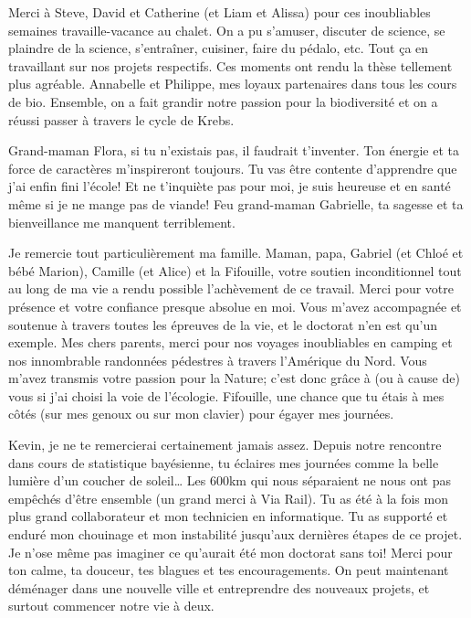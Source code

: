 Merci à Steve, David et Catherine (et Liam et Alissa) pour ces
inoubliables semaines travaille-vacance au chalet. On a pu s'amuser,
discuter de science, se plaindre de la science, s'entraîner, cuisiner,
faire du pédalo, etc. Tout ça en travaillant sur nos projets respectifs.
Ces moments ont rendu la thèse tellement plus agréable. Annabelle et
Philippe, mes loyaux partenaires dans tous les cours de bio. Ensemble,
on a fait grandir notre passion pour la biodiversité et on a réussi
passer à travers le cycle de Krebs.

Grand-maman Flora, si tu n'existais pas, il faudrait t'inventer. Ton
énergie et ta force de caractères m'inspireront toujours. Tu vas être
contente d'apprendre que j'ai enfin fini l'école! Et ne t'inquiète pas
pour moi, je suis heureuse et en santé même si je ne mange pas de
viande! Feu grand-maman Gabrielle, ta sagesse et ta bienveillance me
manquent terriblement.

Je remercie tout particulièrement ma famille. Maman, papa, Gabriel (et
Chloé et bébé Marion), Camille (et Alice) et la Fifouille, votre soutien
inconditionnel tout au long de ma vie a rendu possible l'achèvement de
ce travail. Merci pour votre présence et votre confiance presque absolue
en moi. Vous m'avez accompagnée et soutenue à travers toutes les
épreuves de la vie, et le doctorat n'en est qu'un exemple. Mes chers
parents, merci pour nos voyages inoubliables en camping et nos
innombrable randonnées pédestres à travers l'Amérique du Nord. Vous
m'avez transmis votre passion pour la Nature; c'est donc grâce à (ou à
cause de) vous si j'ai choisi la voie de l'écologie. Fifouille, une
chance que tu étais à mes côtés (sur mes genoux ou sur mon clavier) pour
égayer mes journées.

Kevin, je ne te remercierai certainement jamais assez. Depuis notre
rencontre dans cours de statistique bayésienne, tu éclaires mes journées
comme la belle lumière d'un coucher de soleil\ldots{} Les 600km qui nous
séparaient ne nous ont pas empêchés d'être ensemble (un grand merci à
Via Rail). Tu as été à la fois mon plus grand collaborateur et mon
technicien en informatique. Tu as supporté et enduré mon chouinage et
mon instabilité jusqu'aux dernières étapes de ce projet. Je n'ose même
pas imaginer ce qu'aurait été mon doctorat sans toi! Merci pour ton
calme, ta douceur, tes blagues et tes encouragements. On peut maintenant
déménager dans une nouvelle ville et entreprendre des nouveaux projets,
et surtout commencer notre vie à deux.
